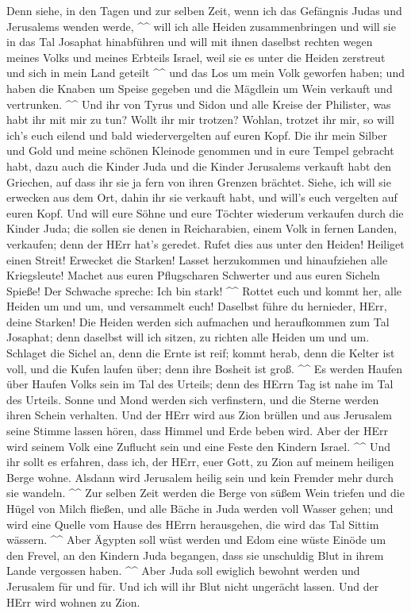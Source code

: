  Denn siehe, in den Tagen und zur selben Zeit, wenn ich das
Gefängnis Judas und Jerusalems wenden werde, \^{}\^{}  will
ich alle Heiden zusammenbringen und will sie in das Tal Josaphat
hinabführen und will mit ihnen daselbst rechten wegen meines Volks und
meines Erbteils Israel, weil sie es unter die Heiden zerstreut und sich
in mein Land geteilt \^{}\^{}  und das Los um mein Volk
geworfen haben; und haben die Knaben um Speise gegeben und die Mägdlein
um Wein verkauft und vertrunken. \^{}\^{}  Und ihr von Tyrus
und Sidon und alle Kreise der Philister, was habt ihr mit mir zu tun?
Wollt ihr mir trotzen? Wohlan, trotzet ihr mir, so will ich's euch
eilend und bald wiedervergelten auf euren Kopf.  Die ihr
mein Silber und Gold und meine schönen Kleinode genommen und in eure
Tempel gebracht habt,  dazu auch die Kinder Juda und die
Kinder Jerusalems verkauft habt den Griechen, auf dass ihr sie ja fern
von ihren Grenzen brächtet.  Siehe, ich will sie erwecken
aus dem Ort, dahin ihr sie verkauft habt, und will's euch vergelten auf
euren Kopf.  Und will eure Söhne und eure Töchter wiederum
verkaufen durch die Kinder Juda; die sollen sie denen in Reicharabien,
einem Volk in fernen Landen, verkaufen; denn der HErr hat's geredet.
 Rufet dies aus unter den Heiden! Heiliget einen Streit!
Erwecket die Starken! Lasset herzukommen und hinaufziehen alle
Kriegsleute!  Machet aus euren Pflugscharen Schwerter und
aus euren Sicheln Spieße! Der Schwache spreche: Ich bin stark! \^{}\^{}
 Rottet euch und kommt her, alle Heiden um und um, und
versammelt euch! Daselbst führe du hernieder, HErr, deine Starken!
 Die Heiden werden sich aufmachen und heraufkommen zum Tal
Josaphat; denn daselbst will ich sitzen, zu richten alle Heiden um und
um.  Schlaget die Sichel an, denn die Ernte ist reif; kommt
herab, denn die Kelter ist voll, und die Kufen laufen über; denn ihre
Bosheit ist groß. \^{}\^{}  Es werden Haufen über Haufen
Volks sein im Tal des Urteils; denn des HErrn Tag ist nahe im Tal des
Urteils.  Sonne und Mond werden sich verfinstern, und die
Sterne werden ihren Schein verhalten.  Und der HErr wird
aus Zion brüllen und aus Jerusalem seine Stimme lassen hören, dass
Himmel und Erde beben wird. Aber der HErr wird seinem Volk eine Zuflucht
sein und eine Feste den Kindern Israel. \^{}\^{}  Und ihr
sollt es erfahren, dass ich, der HErr, euer Gott, zu Zion auf meinem
heiligen Berge wohne. Alsdann wird Jerusalem heilig sein und kein
Fremder mehr durch sie wandeln. \^{}\^{}  Zur selben Zeit
werden die Berge von süßem Wein triefen und die Hügel von Milch fließen,
und alle Bäche in Juda werden voll Wasser gehen; und wird eine Quelle
vom Hause des HErrn herausgehen, die wird das Tal Sittim wässern.
\^{}\^{}  Aber Ägypten soll wüst werden und Edom eine wüste
Einöde um den Frevel, an den Kindern Juda begangen, dass sie unschuldig
Blut in ihrem Lande vergossen haben. \^{}\^{}  Aber Juda
soll ewiglich bewohnt werden und Jerusalem für und für. 
Und ich will ihr Blut nicht ungerächt lassen. Und der HErr wird wohnen
zu Zion.
